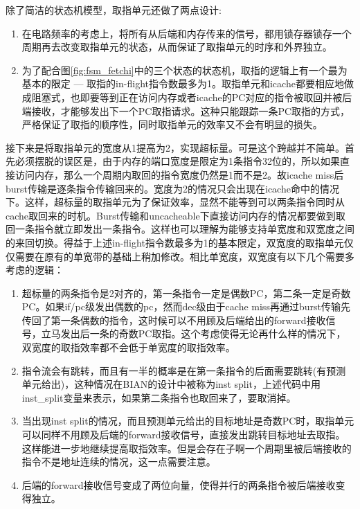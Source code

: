 除了简洁的状态机模型，取指单元还做了两点设计:
\begin{enumerate}[label=(\alph*)]
	\item 在电路频率的考虑上，将所有从后端和内存传来的信号，都用锁存器锁存一个周期再去改变取指单元的状态，从而保证了取指单元的时序和外界独立。
	\item 为了配合图\ref{fig:fsm_fetchi}中的三个状态的状态机，取指的逻辑上有一个最为基本的限定 --- 取指的in-flight指令数最多为1。取指单元和icache都要相应地做成阻塞式，也即要等到正在访问内存或者icache的PC对应的指令被取回并被后端接收，才能够发出下一个PC取指请求。这种只能跟踪一条PC取指的方式，严格保证了取指的顺序性，同时取指单元的效率又不会有明显的损失。
\end{enumerate}

接下来是将取指单元的宽度从1提高为2，实现超标量。可是这个跨越并不简单。首先必须摆脱的误区是，由于内存的端口宽度是限定为1条指令32位的，所以如果直接访问内存，那么一个周期内取回的指令宽度仍然是1而不是2。故icache miss后burst传输是逐条指令传输回来的。宽度为2的情况只会出现在icache命中的情况下。这样，超标量的取指单元为了保证效率，显然不能等到可以两条指令同时从cache取回来的时机。Burst传输和uncacheable下直接访问内存的情况都要做到取回一条指令就立即发出一条指令。这样也可以理解为能够支持单宽度和双宽度之间的来回切换。得益于上述in-flight指令数最多为1的基本限定，双宽度的取指单元仅仅需要在原有的单宽带的基础上稍加修改。相比单宽度，双宽度有以下几个需要多考虑的逻辑：
\begin{enumerate}[label=(\alph*)]
	\item 超标量的两条指令是2对齐的，第一条指令一定是偶数PC，第二条一定是奇数PC。如果if/pc级发出偶数的pc，然而dec级由于cache miss再通过burst传输先传回了第一条偶数的指令，这时候可以不用顾及后端给出的forward接收信号，立马发出后一条的奇数PC取指。这个考虑使得无论再什么样的情况下，双宽度的取指效率都不会低于单宽度的取指效率。
	\item 指令流会有跳转，而且有一半的概率是在第一条指令的后面需要跳转(有预测单元给出)，这种情况在BIAN的设计中被称为inst split，上述代码中用inst\_split变量来表示，如果第二条指令也取回来了，要取消掉。
	\item 当出现inst split的情况，而且预测单元给出的目标地址是奇数PC时，取指单元可以同样不用顾及后端的forward接收信号，直接发出跳转目标地址去取指。这样能进一步地继续提高取指效率。但是会存在子啊一个周期里被后端接收的指令不是地址连续的情况，这一点需要注意。
	\item 后端的forward接收信号变成了两位向量，使得并行的两条指令被后端接收变得独立。
\end{enumerate}

